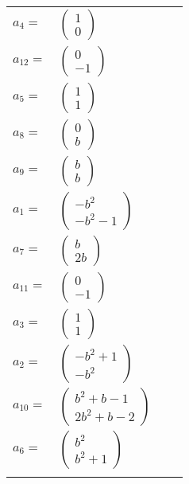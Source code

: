 \documentclass[1p]{elsarticle_modified}
\theoremstyle{definition}
\begin{document}
\begin{tabular}{m{7pt} m{180pt} m{7pt} m{180pt} }
\flushright $a_{4}=$&$\begin{pmatrix}1\\0\end{pmatrix}$ \\
\flushright $a_{12}=$&$\begin{pmatrix}0\\-1\end{pmatrix}$ \\
\flushright $a_{5}=$&$\begin{pmatrix}1\\1\end{pmatrix}$ \\
\flushright $a_{8}=$&$\begin{pmatrix}0\\b\end{pmatrix}$ \\
\flushright $a_{9}=$&$\begin{pmatrix}b\\b\end{pmatrix}$ \\
\flushright $a_{1}=$&$\begin{pmatrix}- b^2\\- b^2-1\end{pmatrix}$ \\
\flushright $a_{7}=$&$\begin{pmatrix}b\\2 b\end{pmatrix}$ \\
\flushright $a_{11}=$&$\begin{pmatrix}0\\-1\end{pmatrix}$ \\
\flushright $a_{3}=$&$\begin{pmatrix}1\\1\end{pmatrix}$ \\
\flushright $a_{2}=$&$\begin{pmatrix}- b^2+1\\- b^2\end{pmatrix}$ \\
\flushright $a_{10}=$&$\begin{pmatrix}b^2+b-1\\2 b^2+b-2\end{pmatrix}$ \\
\flushright $a_{6}=$&$\begin{pmatrix}b^2\\b^2+1\end{pmatrix}$\\&\end{tabular}
\end{document}
